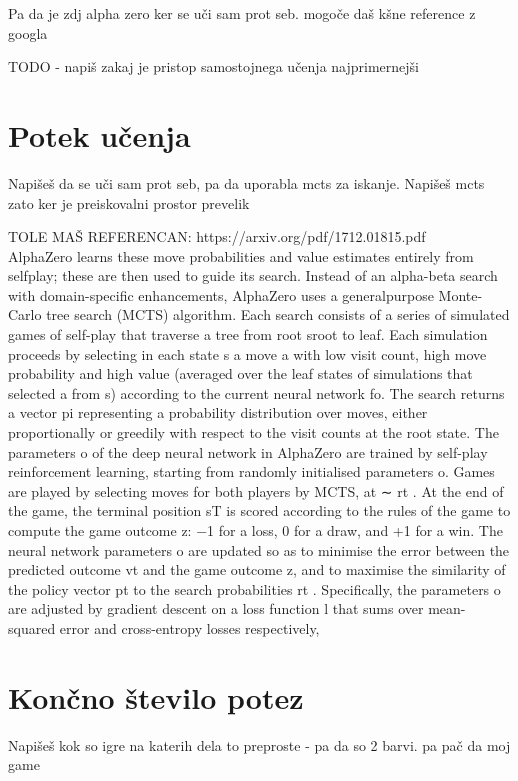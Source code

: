 \documentclass[a4paper, 12pt]{book}
\begin{document}
Pa da je zdj alpha zero ker se uči sam prot seb. mogoče daš kšne reference z googla


TODO - napiš zakaj je pristop samostojnega učenja najprimernejši
\section{Potek učenja}
Napišeš da se uči sam prot seb, pa da uporabla mcts za iskanje. Napišeš mcts zato ker je preiskovalni prostor prevelik

TOLE MAŠ REFERENCAN:
https://arxiv.org/pdf/1712.01815.pdf \\

AlphaZero learns these move probabilities and value estimates entirely from selfplay;
these are then used to guide its search.
Instead of an alpha-beta search with domain-specific enhancements, AlphaZero uses a generalpurpose
Monte-Carlo tree search (MCTS) algorithm. Each search consists of a series of simulated
games of self-play that traverse a tree from root sroot to leaf. Each simulation proceeds by
selecting in each state s a move a with low visit count, high move probability and high value
(averaged over the leaf states of simulations that selected a from s) according to the current
neural network fo. The search returns a vector pi representing a probability distribution over
moves, either proportionally or greedily with respect to the visit counts at the root state.
The parameters o of the deep neural network in AlphaZero are trained by self-play reinforcement
learning, starting from randomly initialised parameters o. Games are played by selecting
moves for both players by MCTS, at ∼ rt
. At the end of the game, the terminal position sT is
scored according to the rules of the game to compute the game outcome z: −1 for a loss, 0 for
a draw, and +1 for a win. The neural network parameters o are updated so as to minimise the
error between the predicted outcome vt and the game outcome z, and to maximise the similarity
of the policy vector pt
to the search probabilities rt
. Specifically, the parameters o are adjusted
by gradient descent on a loss function l that sums over mean-squared error and cross-entropy
losses respectively,



\section{Končno število potez}
Napišeš kok so igre na katerih dela to preproste - pa da so 2 barvi. pa pač da moj game
\end{document}
